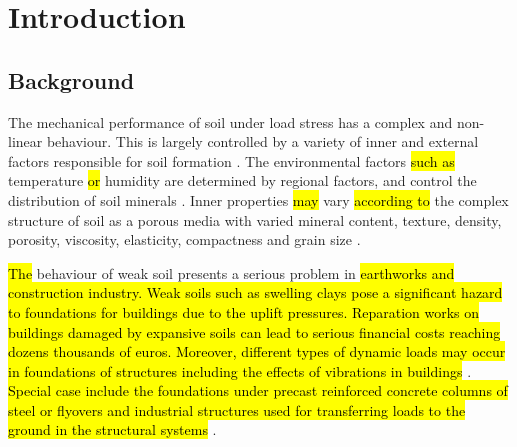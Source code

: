 \documentclass[USenglish,twocolumn]{article}
\begin{document}



  
\maketitle

\section{Introduction}

\subsection{Background}

The mechanical performance of soil under load stress has a complex and non-linear behaviour. This is largely controlled by a variety of inner and external factors responsible for soil formation \cite{Jenny,Buol,Winterkorn1991a}. The environmental factors \hl{such as }temperature \hl{or} humidity\hl{ }are determined by regional factors, and control the distribution of soil minerals \cite{Righi1995,Nesse}. Inner properties\hl{ may }vary \hl{according to }the complex structure of soil as a porous media with varied mineral content, texture, density, porosity, viscosity, elasticity, compactness and grain size \cite{Kaellenetal2014,Kallenetal2016}. 

\hl{The} behaviour of weak soil presents a serious problem in \hl{earthworks and construction industry. Weak  soils such as swelling clays pose a significant hazard to foundations for buildings due to the uplift pressures. Reparation works on buildings damaged by expansive soils can lead to serious financial costs reaching dozens thousands of euros. Moreover, different types of dynamic loads may occur in foundations of structures including the effects of vibrations in buildings} \cite{GOLEWSKI20214344}. \hl{Special case include the foundations under precast reinforced concrete columns of steel or flyovers and industrial structures used for transferring loads to the ground in the structural systems} \cite{NASCIMBENE2021113214,buildings12020192}. 
\end{document}
